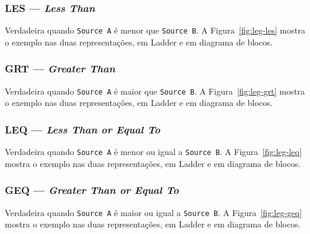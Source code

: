 
\subsubsection{LES --- \emph{Less Than}}

Verdadeira quando \texttt{Source A} é menor que \texttt{Source B}.
A Figura~\ref{fig:leg-les} mostra o exemplo nas duas representações, em Ladder e em diagrama de blocos.


\subsubsection{GRT --- \emph{Greater Than}}

Verdadeira quando \texttt{Source A} é maior que \texttt{Source B}.
A Figura~\ref{fig:leg-grt} mostra o exemplo nas duas representações, em Ladder e em diagrama de blocos.


\subsubsection{LEQ --- \emph{Less Than or Equal To}}

Verdadeira quando \texttt{Source A} é menor ou igual a \texttt{Source B}.
A Figura~\ref{fig:leg-leq} mostra o exemplo nas duas representações, em Ladder e em diagrama de blocos.


\subsubsection{GEQ --- \emph{Greater Than or Equal To}}

Verdadeira quando \texttt{Source A} é maior ou igual a \texttt{Source B}.
A Figura~\ref{fig:leg-geq} mostra o exemplo nas duas representações, em Ladder e em diagrama de blocos.

